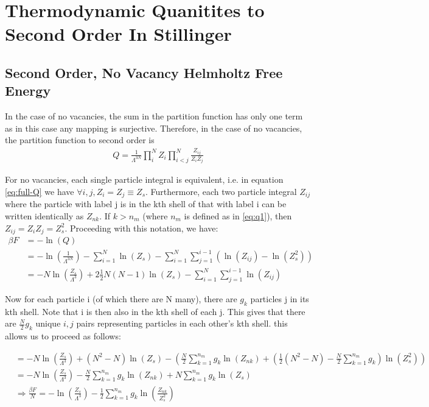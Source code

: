 \documentclass[paper=a4, fontsize=11pt]{scrartcl} %
\numberwithin{equation}{section} %
\numberwithin{figure}{section} %
\numberwithin{table}{section} %
\begin{document}
\section{Thermodynamic Quanitites to Second Order In Stillinger}
\subsection{Second Order, No Vacancy Helmholtz Free Energy}
In the case of no vacancies, the sum in the partition function has only one
term as in this case any mapping is surjective.  Therefore, in the case of no
vacancies, the partition function to second order is
\begin{align}
  Q = \frac{1}{\Lambda^{3N}}\prod\limits_i^N Z_i\prod\limits_{i<j}^N
  \frac{Z_{ij}}{Z_iZ_j}
\end{align}

For no vacancies, each single particle integral is equivalent, i.e. in equation
\ref{eq:full-Q} we have $\forall i,j, Z_i = Z_j \equiv Z_s$.  Furthermore, each
two particle integral $Z_{ij}$ where the particle with label j is in the
kth shell of that with label i can be written identically as
$Z_{nk}$.  If $k > n_m$ (where $n_m$ is defined as in \ref{eq:q1}), then
$Z_{ij} = Z_i Z_j = Z_s^2$. Proceeding with this notation, we have:
\begin{align}
  \beta F &= -\ln(Q)\\
          &= -\ln\left(\frac{1}{\Lambda^{3N}}\right)
            -\sum\limits_{i=1}^N\ln(Z_s)-
             \sum\limits_{i=1}^N\sum\limits_{j=1}^{i-1}(\ln(Z_{ij})-\ln(Z_s^2))\\
          &= -N\ln\left(\frac{Z_s}{\Lambda^3}\right)+
             2\frac{1}{2}N(N-1)\ln(Z_s)-
             \sum\limits_{i=1}^N\sum\limits_{j=1}^{i-1}\ln(Z_{ij})
\end{align}

Now for each particle i (of which there are N many), there are $g_k$ particles
j in its kth shell.  Note that i is then also in the kth shell of each j. This
gives that there are $\frac{N}{2}g_k$ unique $i,j$ pairs representing
particles in each other's kth shell.  this allows us to proceed as follows:

\begin{align}
  &= -N\ln\left(\frac{Z_s}{\Lambda^3}\right)
     +(N^2-N)\ln(Z_s)-\left(\frac{N}{2}\sum\limits_{k=1}^{n_m}g_k\ln(Z_{nk})+
     \left(\frac{1}{2}(N^2-N)-\frac{N}{2}\sum\limits_{k=1}^{n_m}g_k\right)\ln(Z_s^2)\right)\\
  &= -N\ln\left(\frac{Z_s}{\Lambda^3}\right)
      -\frac{N}{2}\sum\limits_{k=1}^{n_m}g_k\ln(Z_{nk}) +
      N\sum\limits_{k=1}^{n_m}g_k \ln(Z_s)\\
  \label{eq:2pfe}
  &\Rightarrow \boxed{\frac{\beta F}{N} = -\ln\left(\frac{Z_s}{\Lambda^3}\right)-
   \frac{1}{2}\sum\limits_{k=1}^{n_m} g_k \ln\left(\frac{Z_{nk}}{Z_s^2}\right)}
\end{align}
\end{document}
